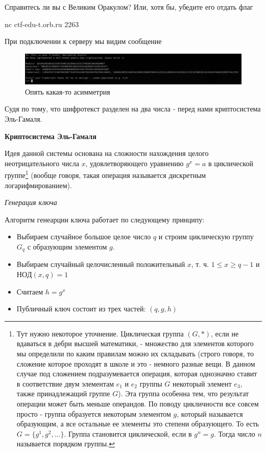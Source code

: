 \documentclass[idxtotoc,hyperref,openany,oneside]{files/crypto} %
\begin{document}
\begin{tcolorbox}
Справитесь ли вы с Великим Оракулом? Или, хотя бы, убедите его отдать флаг

nc ctf-edu-t.orb.ru 2263
\end{tcolorbox}

При подключении к серверу мы видим сообщение
\begin{figure}[H]
\begin{center}
\includegraphics[width=1.0\linewidth]{files/elgamal}
\end{center}
\caption{Опять какая-то асимметрия}
\label{fig:chinese}
\end{figure}
Судя по тому, что шифротекст разделен на два числа - перед нами криптосистема Эль-Гамаля.

\textbf{Криптосистема Эль-Гамаля}

Идея данной системы основана на сложности нахождения целого неотрицательного числа $x$, удовлетворяющего уравнению $g^x = a$ в циклической группе\footnote{Тут нужно некоторое уточнение. Циклическая группа $(G, *)$, если не вдаваться в дебри высшей математики, - множество для элементов которого мы определили по каким правилам можно их складывать (строго говоря, то сложение которое проходят в школе и это - немного разные вещи. В данном случае под сложением подразумевается операция, которая однозначно ставит в соответствие двум элементам $e_1$ и $e_2$ группы $G$ некоторый элемент $e_3$, также принадлежащий группе $G$). Эта группа особенна тем, что результат операции может быть меньше операндов. По поводу цикличности все совсем просто - группа образуется некоторым элементом $g$, который называется образующим, а все остальные ее элементы это степени образующего. То есть $G = \{g^1, g^2, ...\}$. Группа становится циклической, если в $g^n = g$. Тогда число $n$ называется порядком группы.} (вообще говоря, такая операция называется дискретным логарифмированием). 

\textit{Генерация ключа}

Алгоритм генеарции ключа работает по следующему принципу:
\begin{itemize}
	\item Выбираем случайное большое целое число $q$ и строим циклическую группу $G_q$ с образующим элементом $g$.
	\item Выбираем случайный целочисленный положительный $x$, т. ч. $1 \leq x \geq q - 1$ и $НОД(x, q) = 1$
	\item Считаем $h = g^x$
	\item Публичный ключ состоит из трех частей: $(q, g, h)$
\end{itemize}
\end{document}
